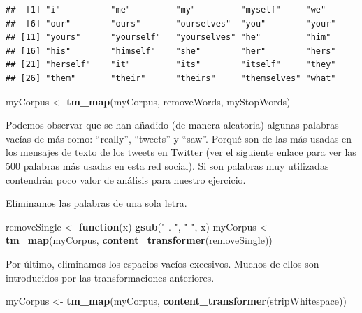 \documentclass[]{article}
\newenvironment{Shaded}{\begin{snugshade}}{\end{snugshade}}
\newcommand{\ControlFlowTok}[1]{\textcolor[rgb]{0.13,0.29,0.53}{\textbf{#1}}}
\newcommand{\KeywordTok}[1]{\textcolor[rgb]{0.13,0.29,0.53}{\textbf{#1}}}
\newcommand{\NormalTok}[1]{#1}
\newcommand{\StringTok}[1]{\textcolor[rgb]{0.31,0.60,0.02}{#1}}
\begin{document}
\begin{verbatim}
##  [1] "i"          "me"         "my"         "myself"     "we"        
##  [6] "our"        "ours"       "ourselves"  "you"        "your"      
## [11] "yours"      "yourself"   "yourselves" "he"         "him"       
## [16] "his"        "himself"    "she"        "her"        "hers"      
## [21] "herself"    "it"         "its"        "itself"     "they"      
## [26] "them"       "their"      "theirs"     "themselves" "what"
\end{verbatim}

\begin{Shaded}
\begin{Highlighting}[]
\NormalTok{myCorpus <-}\StringTok{ }\KeywordTok{tm_map}\NormalTok{(myCorpus, removeWords, myStopWords) }
\end{Highlighting}
\end{Shaded}

Podemos observar que se han añadido (de manera aleatoria) algunas palabras vacías de más como: ``really'', ``tweets'' y ``saw''. Porqué son de las más usadas en los mensajes de texto de los tweets en Twitter (ver el siguiente \href{https://techland.time.com/2009/06/08/the-500-most-frequently-used-words-on-twitter/}{\color{blue}enlace} para ver las 500 palabras más usadas en esta red social). Si son palabras muy utilizadas contendrán poco valor de análisis para nuestro ejercicio.

Eliminamos las palabras de una sola letra.

\begin{Shaded}
\begin{Highlighting}[]
\NormalTok{removeSingle <-}\StringTok{ }\ControlFlowTok{function}\NormalTok{(x) }\KeywordTok{gsub}\NormalTok{(}\StringTok{" . "}\NormalTok{, }\StringTok{" "}\NormalTok{, x)   }
\NormalTok{myCorpus <-}\StringTok{ }\KeywordTok{tm_map}\NormalTok{(myCorpus, }\KeywordTok{content_transformer}\NormalTok{(removeSingle))}
\end{Highlighting}
\end{Shaded}

Por último, eliminamos los espacios vacíos excesivos. Muchos de ellos son
introducidos por las transformaciones anteriores.

\begin{Shaded}
\begin{Highlighting}[]
\NormalTok{myCorpus <-}\StringTok{ }\KeywordTok{tm_map}\NormalTok{(myCorpus, }\KeywordTok{content_transformer}\NormalTok{(stripWhitespace))}
\end{Highlighting}
\end{Shaded}
\end{document}

